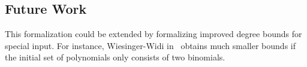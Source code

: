 \documentclass[11pt,a4paper]{article}
\begin{document}
\subsection{Future Work}

This formalization could be extended by formalizing improved degree bounds for special input. For instance, Wiesinger-Widi in~\cite{Wiesinger-Widi2015} obtains much smaller bounds if the initial set of polynomials only consists of two binomials.





\end{document}
